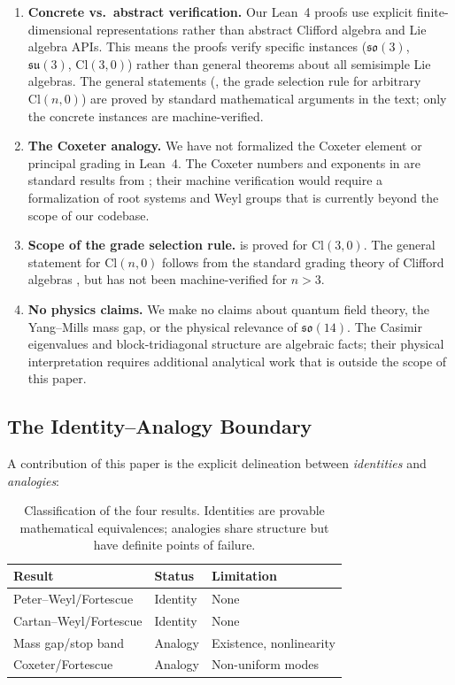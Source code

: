 \documentclass[11pt]{article}
\newcommand{\so}{\mathfrak{so}}
\newcommand{\su}{\mathfrak{su}}
\newcommand{\Cl}{\mathrm{Cl}}
\begin{document}
\begin{enumerate}[leftmargin=*]
\item \textbf{Concrete vs.\ abstract verification.} Our Lean~4 proofs
  use explicit finite-dimensional representations rather than abstract
  Clifford algebra and Lie algebra APIs. This means the proofs verify
  specific instances ($\so(3)$, $\su(3)$, $\Cl(3,0)$) rather than
  general theorems about all semisimple Lie algebras. The general
  statements (, the grade selection rule
  for arbitrary $\Cl(n,0)$) are proved by standard mathematical arguments
  in the text; only the concrete instances are machine-verified.

\item \textbf{The Coxeter analogy.} We have not formalized the Coxeter
  element or principal grading in Lean~4. The Coxeter numbers and
  exponents in  are standard results from
  \cite{humphreys1990}; their machine verification would require a
  formalization of root systems and Weyl groups that is currently beyond
  the scope of our codebase.

\item \textbf{Scope of the grade selection rule.} 
  is proved for $\Cl(3,0)$. The general statement for $\Cl(n,0)$ follows
  from the standard grading theory of Clifford algebras
  \cite{lounesto2001}, but has not been machine-verified for $n > 3$.

\item \textbf{No physics claims.} We make no claims about quantum field
  theory, the Yang--Mills mass gap, or the physical relevance of
  $\so(14)$. The Casimir eigenvalues and block-tridiagonal structure are
  algebraic facts; their physical interpretation requires additional
  analytical work that is outside the scope of this paper.
\end{enumerate}

\subsection{The Identity--Analogy Boundary}

A contribution of this paper is the explicit delineation between
\emph{identities} and \emph{analogies}:

\begin{table}[htbp]
\centering
\caption{Classification of the four results. Identities are provable
  mathematical equivalences; analogies share structure but have definite
  points of failure.}
\label{tab:identity-analogy}
\begin{tabular}{@{}lll@{}}
\toprule
\textbf{Result} & \textbf{Status} & \textbf{Limitation} \\
\midrule
Peter--Weyl/Fortescue & Identity & None \\
Cartan--Weyl/Fortescue & Identity & None \\
Mass gap/stop band & Analogy & Existence, nonlinearity \\
Coxeter/Fortescue & Analogy & Non-uniform modes \\
\bottomrule
\end{tabular}
\end{table}
\end{document}
